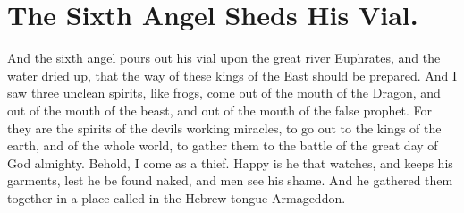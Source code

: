 \chapter[Sermon 71. The Sixth Angel Sheds His Vial.]{The Sixth Angel Sheds His Vial.}
\label{sermon:071}

And the sixth angel pours out his vial upon the great river Euphrates, and the water dried up, that the way of these kings of the East should be prepared. And I saw three unclean spirits, like frogs, come out of the mouth of the Dragon, and out of the mouth of the beast, and out of the mouth of the false prophet. For they are the spirits of the devils working miracles, to go out to the kings of the earth, and of the whole world, to gather them to the battle of the great day of God almighty. Behold, I come as a thief. Happy is he that watches, and keeps his garments, lest he be found naked, and men see his shame. And he gathered them together in a place called in the Hebrew tongue Armageddon.

